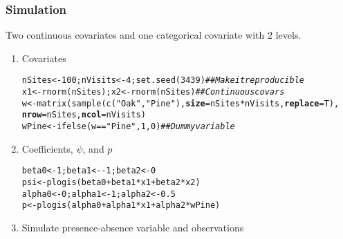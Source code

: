 \documentclass[color=usenames,dvipsnames]{beamer}\usepackage[]{graphicx}\usepackage[]{color}
\makeatletter
\newcommand{\hlnum}[1]{\textcolor[rgb]{0.69,0.494,0}{#1}}%
\newcommand{\hlstr}[1]{\textcolor[rgb]{0.749,0.012,0.012}{#1}}%
\newcommand{\hlcom}[1]{\textcolor[rgb]{0.514,0.506,0.514}{\textit{#1}}}%
\newcommand{\hlopt}[1]{\textcolor[rgb]{0,0,0}{#1}}%
\newcommand{\hlstd}[1]{\textcolor[rgb]{0,0,0}{#1}}%
\newcommand{\hlkwb}[1]{\textcolor[rgb]{0,0.341,0.682}{#1}}%
\newcommand{\hlkwc}[1]{\textcolor[rgb]{0,0,0}{\textbf{#1}}}%
\newcommand{\hlkwd}[1]{\textcolor[rgb]{0.004,0.004,0.506}{#1}}%
\newenvironment{kframe}{%
 \def\at@end@of@kframe{}%
 \ifinner\ifhmode%
  \def\at@end@of@kframe{\end{minipage}}%
  \begin{minipage}{\columnwidth}%
 \fi\fi%
 \def\FrameCommand##1{\hskip\@totalleftmargin \hskip-\fboxsep
 \colorbox{shadecolor}{##1}\hskip-\fboxsep
     \hskip-\linewidth \hskip-\@totalleftmargin \hskip\columnwidth}%
 \MakeFramed {\advance\hsize-\width
   \@totalleftmargin\z@ \linewidth\hsize
   \@setminipage}}%
 {\par\unskip\endMakeFramed%
 \at@end@of@kframe}
\newenvironment{knitrout}{}{} %
\makeatother
\begin{document}
\begin{frame}[fragile]
  \frametitle{Simulation}
  \small
  Two continuous covariates and one categorical covariate with 2 levels.
  \vfill
  \begin{enumerate}[<+->]
  \item Covariates
\begin{knitrout}\scriptsize
{}\color{fgcolor}\begin{kframe}
\begin{alltt}
\hlstd{nSites} \hlkwb{<-} \hlnum{100}\hlstd{; nVisits} \hlkwb{<-} \hlnum{4}\hlstd{;} \hlkwd{set.seed}\hlstd{(}\hlnum{3439}\hlstd{)} \hlcom{## Make it reproducible}
\hlstd{x1} \hlkwb{<-} \hlkwd{rnorm}\hlstd{(nSites); x2} \hlkwb{<-} \hlkwd{rnorm}\hlstd{(nSites)}    \hlcom{## Continuous covars}
\hlstd{w} \hlkwb{<-} \hlkwd{matrix}\hlstd{(}\hlkwd{sample}\hlstd{(}\hlkwd{c}\hlstd{(}\hlstr{"Oak"}\hlstd{,} \hlstr{"Pine"}\hlstd{),} \hlkwc{size}\hlstd{=nSites}\hlopt{*}\hlstd{nVisits,} \hlkwc{replace}\hlstd{=T),}
            \hlkwc{nrow}\hlstd{=nSites,} \hlkwc{ncol}\hlstd{=nVisits)}
\hlstd{wPine} \hlkwb{<-} \hlkwd{ifelse}\hlstd{(w}\hlopt{==}\hlstr{"Pine"}\hlstd{,} \hlnum{1}\hlstd{,} \hlnum{0}\hlstd{)}            \hlcom{## Dummy variable}
\end{alltt}
\end{kframe}
\end{knitrout}
  \item Coefficients, $\psi$, and $p$
\begin{knitrout}\scriptsize
{}\color{fgcolor}\begin{kframe}
\begin{alltt}
\hlstd{beta0} \hlkwb{<-} \hlnum{1}\hlstd{; beta1} \hlkwb{<-} \hlopt{-}\hlnum{1}\hlstd{; beta2} \hlkwb{<-} \hlnum{0}
\hlstd{psi} \hlkwb{<-} \hlkwd{plogis}\hlstd{(beta0} \hlopt{+} \hlstd{beta1}\hlopt{*}\hlstd{x1} \hlopt{+} \hlstd{beta2}\hlopt{*}\hlstd{x2)}
\hlstd{alpha0} \hlkwb{<-} \hlnum{0}\hlstd{; alpha1} \hlkwb{<-} \hlnum{1}\hlstd{; alpha2} \hlkwb{<-} \hlnum{0.5}
\hlstd{p} \hlkwb{<-} \hlkwd{plogis}\hlstd{(alpha0} \hlopt{+} \hlstd{alpha1}\hlopt{*}\hlstd{x1} \hlopt{+} \hlstd{alpha2}\hlopt{*}\hlstd{wPine)}
\end{alltt}
\end{kframe}
\end{knitrout}
  \item Simulate presence-absence variable and observations
\begin{knitrout}\scriptsize

\end{knitrout}
\end{enumerate}
\end{frame}
\end{document}
